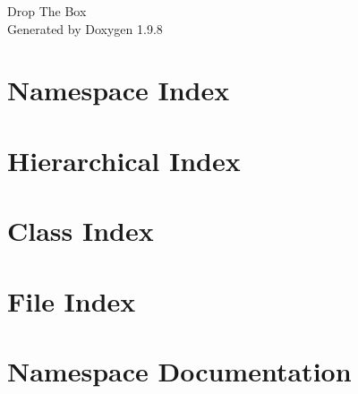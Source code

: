 \documentclass[twoside]{book}
\newcommand{\+}{\discretionary{\mbox{\scriptsize$\hookleftarrow$}}{}{}}
\newcommand{\clearemptydoublepage}{%
    \newpage{\pagestyle{empty}\cleardoublepage}%
  }
\begin{document}
  \raggedbottom
    \hypersetup{pageanchor=false,
                bookmarksnumbered=true,
                pdfencoding=unicode
               }
  \begin{titlepage}
  \vspace*{7cm}
  \begin{center}%
  {\Large Drop The Box}\\
  \vspace*{1cm}
  {\large Generated by Doxygen 1.9.8}\\
  \end{center}
  \end{titlepage}
  \clearemptydoublepage
  \tableofcontents
  \clearemptydoublepage
  \hypersetup{pageanchor=true}
\chapter{Namespace Index}

\chapter{Hierarchical Index}

\chapter{Class Index}

\chapter{File Index}

\chapter{Namespace Documentation}





\end{document}

